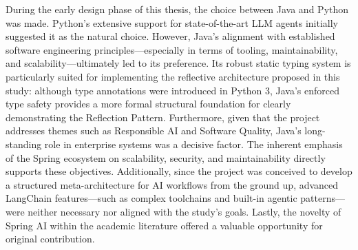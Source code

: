During the early design phase of this thesis, the choice between Java and Python was made. Python's extensive support for state-of-the-art LLM agents initially suggested it as the natural choice. However, Java's alignment with established software engineering principles—especially in terms of tooling, maintainability, and scalability—ultimately led to its preference. Its robust static typing system is particularly suited for implementing the reflective architecture proposed in this study: although type annotations were introduced in Python 3, Java's enforced type safety provides a more formal structural foundation for clearly demonstrating the Reflection Pattern. Furthermore, given that the project addresses themes such as Responsible AI and Software Quality, Java's long-standing role in enterprise systems was a decisive factor. The inherent emphasis of the Spring ecosystem on scalability, security, and maintainability directly supports these objectives. Additionally, since the project was conceived to develop a structured meta-architecture for AI workflows from the ground up, advanced LangChain features—such as complex toolchains and built-in agentic patterns—were neither necessary nor aligned with the study's goals. Lastly, the novelty of Spring AI within the academic literature offered a valuable opportunity for original contribution.